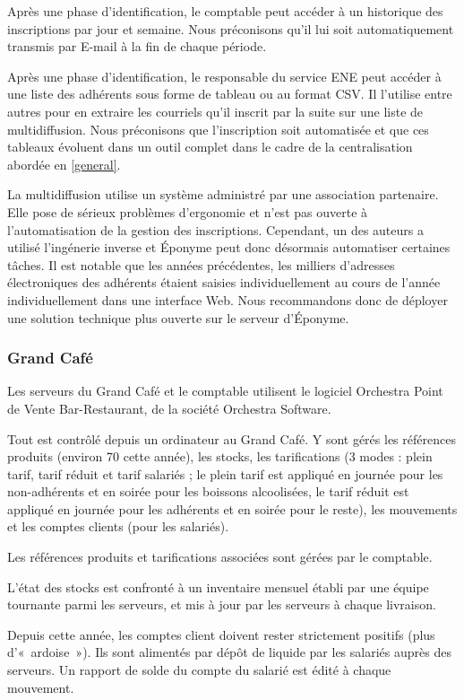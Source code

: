 Après une phase d'identification, le comptable peut accéder à un historique des inscriptions
par jour et semaine. Nous préconisons qu'il lui soit automatiquement transmis par E-mail
à la fin de chaque période.

Après une phase d'identification, le responsable du service ENE peut accéder à une liste
des adhérents sous forme de tableau ou au format CSV. Il l'utilise entre autres pour en
extraire les courriels qu'il inscrit par la suite sur une liste de multidiffusion.
Nous préconisons que l'inscription soit automatisée
et que ces tableaux évoluent dans un outil complet
dans le cadre de la centralisation abordée en \ref{general}.

La multidiffusion utilise un système administré par une association partenaire.
Elle pose de sérieux problèmes d'ergonomie et n'est pas ouverte à l'automatisation de
la gestion des inscriptions. Cependant, un des auteurs a utilisé l'ingénerie inverse
et Éponyme peut donc désormais automatiser certaines tâches. Il est notable que les années
précédentes, les milliers d'adresses électroniques des adhérents étaient saisies
individuellement au cours de l'année individuellement dans une interface Web.
Nous recommandons donc de déployer une solution technique plus ouverte
sur le serveur d'Éponyme.

\subsubsection{Grand Café}

Les serveurs du Grand Café et le comptable utilisent le logiciel Orchestra
Point de Vente Bar-Restaurant, de la société Orchestra Software.

Tout est contrôlé depuis un ordinateur au Grand Café. Y sont gérés les
références produits (environ 70 cette année), les stocks, les tarifications
(3 modes : plein tarif, tarif réduit et tarif salariés ; le plein tarif
est appliqué en journée pour les non-adhérents et en soirée pour les boissons
alcoolisées, le tarif réduit est appliqué en journée pour les adhérents
et en soirée pour le reste), les mouvements et les comptes clients (pour les
salariés).

Les références produits et tarifications associées sont gérées par le comptable.

L'état des stocks est confronté à un inventaire mensuel établi par une équipe
tournante parmi les serveurs, et mis à jour par les serveurs à chaque
livraison.

Depuis cette année, les comptes client doivent rester strictement positifs
(plus d'«~ardoise~»).
Ils sont alimentés par dépôt de liquide par les salariés auprès des serveurs.
Un rapport de solde du compte du salarié est édité à chaque mouvement.

